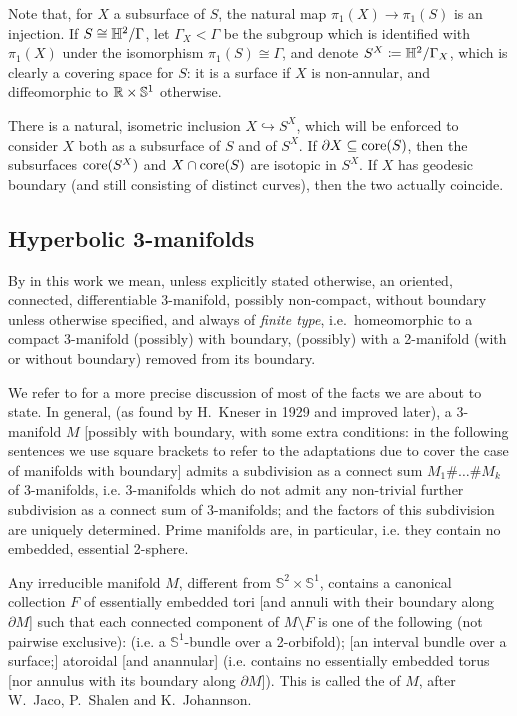 Note that, for $X$ a subsurface of $S$, the natural map $\pi_1(X)\rightarrow \pi_1(S)$ is an injection. If $S\cong \mathbb H^2/\Gamma$, let $\Gamma_X<\Gamma$ be the subgroup which is identified with $\pi_1(X)$ under the isomorphism $\pi_1(S)\cong\Gamma$, and denote $S^X\coloneqq \mathbb H^2/\Gamma_X$, which is clearly a covering space for $S$: it is a surface if $X$ is non-annular, and diffeomorphic to $\mathbb R\times\mathbb S^1$ otherwise.

There is a natural, isometric inclusion $X\hookrightarrow S^X$, which will be enforced to consider $X$ both as a subsurface of $S$ and of $S^X$. If $\partial X\subseteq \mathrm{core}(S)$, then the subsurfaces $\mathrm{core}(S^X)$ and $X\cap\mathrm{core}(S)$ are isotopic in $S^X$. If $X$ has geodesic boundary (and still consisting of distinct curves), then the two actually coincide.

\subsection{Hyperbolic 3-manifolds}\label{sec:hyp3mflds}

By  in this work we mean, unless explicitly stated otherwise, an oriented, connected, differentiable 3-manifold, possibly non-compact, without boundary unless otherwise specified, and always of \emph{finite type}, i.e.\ homeomorphic to a compact 3-manifold (possibly) with boundary, (possibly) with a 2-manifold (with or without boundary) removed from its boundary.

We refer to \cite{bonahon2002geometric} for a more precise discussion of most of the facts we are about to state. In general, (as found by H.~Kneser in 1929 and improved later), a 3-manifold $M$ [possibly with boundary, with some extra conditions: in the following sentences we use square brackets to refer to the adaptations due to cover the case of manifolds with boundary] admits a subdivision as a connect sum $M_1\#\ldots \# M_k$ of  3-manifolds, i.e. 3-manifolds which do not admit any non-trivial further subdivision as a connect sum of 3-manifolds; and the factors of this subdivision are uniquely determined. Prime manifolds are, in particular,  i.e. they contain no embedded, essential 2-sphere.

Any irreducible manifold $M$, different from $\mathbb S^2\times\mathbb S^1$, contains a canonical collection $F$ of essentially embedded tori [and annuli with their boundary along $\partial M$] such that each connected component of $M\setminus F$ is one of the following (not pairwise exclusive):  (i.e. a $\mathbb S^1$-bundle over a 2-orbifold); [an interval bundle over a surface;] atoroidal [and anannular] (i.e. contains no essentially embedded torus [nor annulus with its boundary along $\partial M$]). This is called the  of $M$, after W.~Jaco, P.~Shalen and K.~Johannson.


